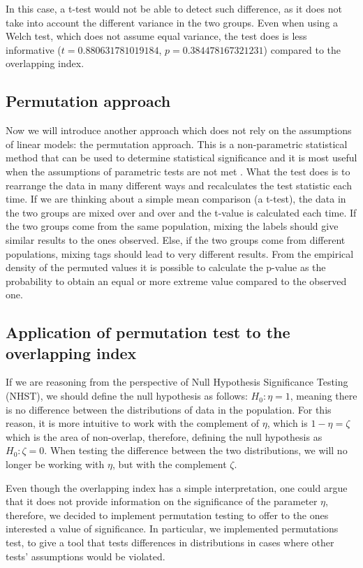 \documentclass[twocolumn]{article}
\begin{document}
In this case, a t-test would not be able to detect such difference, as it does not take into account the different variance in the two groups. Even when using a Welch test, which does not assume equal variance, the test does is less informative ($t = 0.880631781019184$, $p = 0.384478167321231$) compared to the overlapping index.

\subsection{Permutation approach}

 Now we will introduce another approach which does not rely on the assumptions of linear models: the permutation approach. This is a non-parametric statistical method that can be used to determine statistical significance and it is most useful when the assumptions of parametric tests are not met \cite{pesarin2010permutation}. What the test does is to rearrange the data in many different ways and recalculates the test statistic each time. If we are thinking about a simple mean comparison (a t-test), the data in the two groups are mixed over and over and the t-value is calculated each time. If the two groups come from the same population, mixing the labels should give similar results to the ones observed. Else, if the two groups come from different populations, mixing tags should lead to very different results. From the empirical density of the permuted values it is possible to calculate the p-value as the probability to obtain an equal or more extreme value compared to the observed one. 

\subsection{Application of permutation test to the overlapping index}

If we are reasoning from the perspective of Null Hypothesis Significance Testing (NHST), we should define the null hypothesis as follows: $H_0: \eta = 1$,  meaning there is no difference between the distributions of data in the population. For this reason, it is more intuitive to work with the complement of $\eta$, which is  $1-\eta = \zeta$ which is the area of non-overlap, therefore, defining the null hypothesis as  $H_0:\zeta = 0$. When testing the difference between the two distributions, we will no longer be working with $\eta$, but with the complement $\zeta$. 

Even though the overlapping index has a simple interpretation, one could argue that it does not provide information on the significance of the parameter $\eta$, therefore, we decided to implement permutation testing to offer to the ones interested a value of significance. In particular, we implemented permutations test, to give a tool that tests differences in distributions in cases where other tests' assumptions would be violated.
\end{document}
